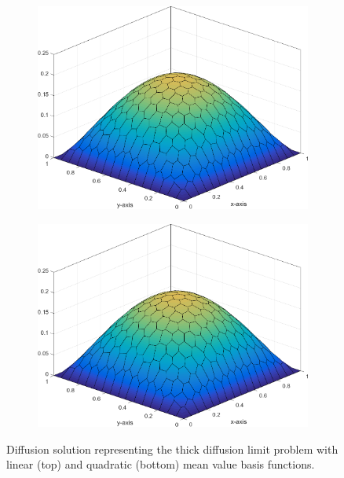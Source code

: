 \begin{figure}
\centering
{
	\begin{subfigure}[b]{0.75\textwidth}
		\centering
		\label{subfig::DL_diff_mv_k1}
		\includegraphics[width=\textwidth]{figures/sec_BF/Sq_poly_MV_k=1.png}
	\end{subfigure}
}
	\vspace{10mm}
{
	\begin{subfigure}[b]{0.75\textwidth}
		\centering
		\label{subfig::DL_diff_mv_k2}
		\includegraphics[width=\textwidth]{figures/sec_BF/Sq_poly_MV_k=2.png}
	\end{subfigure}
}
\vspace{2mm}
\caption{Diffusion solution representing the thick diffusion limit problem with linear (top) and quadratic (bottom) mean value basis functions.}
\label{fig::BF_Results_DL_DiffSol}
\end{figure}

